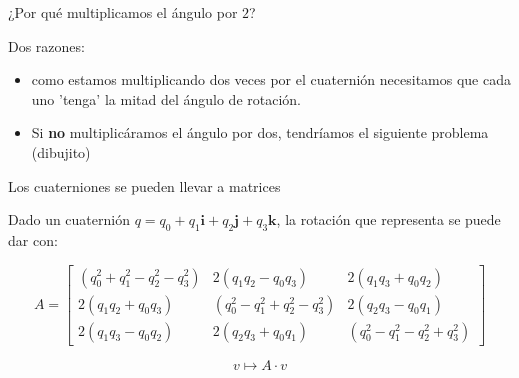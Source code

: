 \documentclass[10pt]{beamer}
\def\R{\mathbb{R}}
\begin{document}
\begin{frame}{¿Por qué multiplicamos el ángulo por $2$?}

Dos razones:

\begin{itemize}
    \item como estamos multiplicando dos veces por el cuaternión necesitamos que cada uno 'tenga' la mitad del ángulo de rotación.
    \item Si \textbf{no} multiplicáramos el ángulo por dos, tendríamos el siguiente problema (dibujito)
\end{itemize}








\end{frame}

\iffalse
\begin{frame}{Los cuaterniones se pueden llevar a matrices}

Dado un cuaternión $q=q_0 + q_1 \textbf{i} + q_2 \textbf{j} + q_3 \textbf{k}$, la rotación que representa se puede dar con: 

\[
A = \begin{bmatrix}
    (q_0^2+q_1^2-q_2^2-q_3^2)  &  2(q_1 q_2 - q_0 q_3) & 2(q_1 q_3 + q_0 q_2)      \\
    2(q_1 q_2 + q_0 q_3) & (q_0^2 - q_1^2 + q_2^2 - q_3^2) & 2(q_2 q_3 - q_0 q_1) \\
    2(q_1 q_3 - q_0 q_2) & 2(q_2 q_3 + q_0 q_1) & (q_0^2 - q_1^2 - q_2^2 + q_3^2)
\end{bmatrix}
\]



$$v \mapsto A\cdot v$$
\end{frame}
\end{document}
